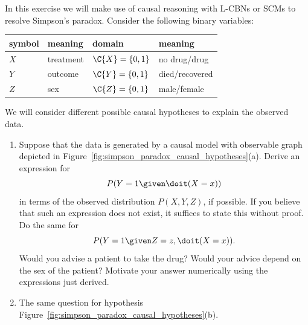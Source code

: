 In this exercise we will make use of causal reasoning with L-CBNs or SCMs to resolve Simpson's paradox.
Consider the following binary variables:
\begin{center}\begin{tabular}{llll}
  symbol & meaning & domain & meaning \\
  \hline
  $X$ & treatment & $\C{X} = \{0,1\}$ & no drug/drug \\
  $Y$ & outcome   & $\C{Y} = \{0,1\}$ & died/recovered \\
  $Z$ & sex       & $\C{Z} = \{0,1\}$ & male/female
\end{tabular}\end{center}
We will consider different possible causal hypotheses to explain the observed data.
\begin{enumerate}[label=\alph*)]
  \item Suppose that the data is generated by a causal model with observable graph depicted in Figure~\ref{fig:simpson_paradox_causal_hypotheses}(a). Derive an expression for
    $$P(Y=1 \given \doit(X=x))$$
    in terms of the observed distribution $P(X,Y,Z)$, if possible.
    If you believe that such an expression does not exist, it suffices to state this without proof.
    Do the same for
    $$P(Y=1 \given Z=z,\doit(X=x)).$$
    Would you advise a patient to take the drug? Would your advice depend on the sex of the patient? 
    Motivate your answer numerically using the expressions just derived.
  \item The same question for hypothesis Figure~\ref{fig:simpson_paradox_causal_hypotheses}(b).

\end{enumerate}
